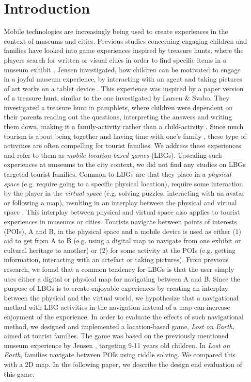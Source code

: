 \section{Introduction}
Mobile technologies are increasingly being used to create experiences in the context of museums and cities. Previous studies concerning engaging children and families have looked into game experiences inspired by treasure hunts, where the players search for written or visual clues in order to find specific items in a museum exhibit \cite{Lynge} \cite{larsen2014tourist}. Jensen investigated, how children can be motivated to engage in a joyful museum experience, by interacting with an agent and taking pictures of art works on a tablet device \cite{Lynge}. This experience was inspired by a paper version of a treasure hunt, similar to the one investigated by Larsen \& Svabo. They investigated a treasure hunt in pamphlets, where children were dependent on their parents reading out the questions, interpreting the answers and writing them down, making it a family-activity rather than a child-activity \cite{larsen2014tourist}. Since much tourism is about being together and having time with one’s family \cite{larsen2014tourist}, these type of activities are often compelling for tourist families. We address these experiences and refer to them as \textit{mobile location-based games} (LBGs). Upscaling such experiences at museums to the city context, we did not find any studies on LBGs targeted tourist families. Common to LBGs are that they place in a \textit{physical space} (e.g. require going to a specific physical location), require some interaction by the player in the \textit{virtual space} (e.g. solving puzzles, interacting with an avatar or following a map), resulting in an interplay between the physical and virtual space \cite{LBG_Review}. This interplay between physical and virtual space also applies to tourist experiences in museums or cities. Tourists navigate between points of interests (POIs), A and B, in the physical space and a mobile device is used as either (1) aid to get from A to B (e.g. using a digital map to navigate from one exhibit or cultural heritage to another) or (2) for some activity at the POIs (e.g. getting information, interacting with an artefact or taking pictures). From previous research, we found that a common tendency for LBGs is that the user simply uses either a digital or physical map for navigating between A and B. Since the purpose of LBGs is to create enjoyable experiences by creating an interplay between the physical and the virtual world, we hypothesize that a navigational method with LBG activities in the navigation instead of a map can increase enjoyment of the experience. In order to evaluate the effects of such navigational method, we designed and implemented a location-based game, \textit{Lost on Earth}, aimed at tourist families. The game was based on the previously mentioned museum experience by Jensen \cite{Lynge}, targeting 9-11 years old children. In \textit{Lost on Earth}, families navigate between POIs using riddle solving. We compared this with a 2D map. In the following paper, we describe the design end evaluation of this game. 

